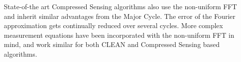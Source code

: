State-of-the art Compressed Sensing algorithms also use the non-uniform FFT and inherit similar advantages from the Major Cycle. The error of the Fourier approximation gets continually reduced over several cycles. More complex measurement equations have been incorporated with the non-uniform FFT in mind, and work similar for both CLEAN and Compressed Sensing based algorithms. 


 








